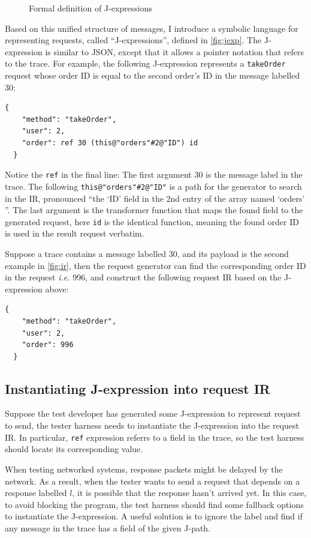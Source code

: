 \documentclass{article}
\newcommand{\ilc}[1]{\lstinline[style=customcoq]{#1}}
\newcommand{\ilj}[1]{\lstinline[style=json]{#1}}
\theoremstyle{definition}
\begin{document}
\begin{figure}
  \ottall
  \caption{Formal definition of J-expressions}
  \label{fig:jexp}
\end{figure}

Based on this unified structure of messages, I introduce a symbolic language for
representing requests, called ``J-expressions'', defined in \autoref{fig:jexp}.
The J-expression is similar to JSON, except that it allows a pointer notation
that refers to the trace.  For example, the following J-expression represents a
\ilc{takeOrder} request whose order ID is equal to the second order's ID in the
message labelled 30:
\begin{lstlisting}[style=json]
  {
    "method": "takeOrder",
    "user": 2,
    "order": ref 30 (this@"orders"#2@"ID") id
  }
\end{lstlisting}

Notice the \ilc{ref} in the final line: The first argument 30 is the message
label in the trace.  The following \ilj{this@"orders"#2@"ID"} is a path for the
generator to search in the IR, pronounced ``the `ID' field in the 2nd entry of
the array named `orders' ''.  The last argument is the transformer function that
maps the found field to the generated request, here \ilj{id} is the identical
function, meaning the found order ID is used in the result request verbatim.

Suppose a trace contains a message labelled 30, and its payload is the second
example in \autoref{fig:ir}, then the request generator can find the
corresponding order ID in the request {\it i.e.}  996, and construct the
following request IR based on the J-expression above:

\begin{lstlisting}[style=json]
  {
    "method": "takeOrder",
    "user": 2,
    "order": 996
  }
\end{lstlisting}

\subsection{Instantiating J-expression into request IR}
Suppose the test developer has generated some J-expression to represent request
to send, the tester harness needs to instantiate the J-expression into the
request IR.  In particular, \ilj{ref} expression referrs to a field in the
trace, so the test harness should locate its corresponding value.

When testing networked systems, response packets might be delayed by the
network.  As a result, when the tester wants to send a request that depends on a
response labelled $l$, it is possible that the response hasn't arrived yet.  In
this case, to avoid blocking the program, the test harness should find some
fallback options to instantiate the J-expression.  A useful solution is to
ignore the label and find if any message in the trace has a field of the given
J-path.
\end{document}
